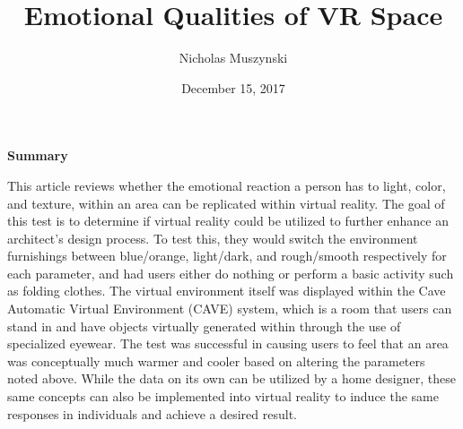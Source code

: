 \documentclass{article}
\begin{document}
\title{Emotional Qualities of VR Space}
\author{Nicholas Muszynski}
\date{December 15, 2017}

\maketitle

\textbf{Summary}
\newline

This article reviews whether the emotional reaction a person has to light, color, and texture, within an area can be replicated within virtual reality. The goal of this test is to determine if virtual reality could be utilized to further enhance an architect's design process. To test this, they would switch the environment furnishings between blue/orange, light/dark, and rough/smooth respectively for each parameter, and had users either do nothing or perform a basic activity such as folding clothes. The virtual environment itself was displayed within the Cave Automatic Virtual Environment (CAVE) system, which is a room that users can stand in and have objects virtually generated within through the use of specialized eyewear. The test was successful in causing users to feel that an area was conceptually much warmer and cooler based on altering the parameters noted above. While the data on its own can be utilized by a home designer, these same concepts can also be implemented into virtual reality to induce the same responses in individuals and achieve a desired result.

\nocite{emotionCite}



\end{document}
